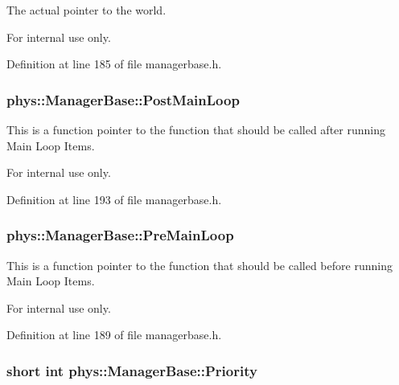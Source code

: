The actual pointer to the world. 

\begin{DoxyInternal}{For internal use only.}
\end{DoxyInternal}


Definition at line 185 of file managerbase.h.

\hypertarget{classphys_1_1ManagerBase_aa1e80a30f151c07e06d1f4650f315da5}{
\subsubsection[{PostMainLoop}]{ {\bf phys::ManagerBase::PostMainLoop}}}
\label{d2/de3/classphys_1_1ManagerBase_aa1e80a30f151c07e06d1f4650f315da5}


This is a function pointer to the function that should be called after running Main Loop Items. 

\begin{DoxyInternal}{For internal use only.}
\end{DoxyInternal}


Definition at line 193 of file managerbase.h.

\hypertarget{classphys_1_1ManagerBase_a93eb2f1a30d913a4e99180b0965eb5db}{
\subsubsection[{PreMainLoop}]{ {\bf phys::ManagerBase::PreMainLoop}}}
\label{d2/de3/classphys_1_1ManagerBase_a93eb2f1a30d913a4e99180b0965eb5db}


This is a function pointer to the function that should be called before running Main Loop Items. 

\begin{DoxyInternal}{For internal use only.}
\end{DoxyInternal}


Definition at line 189 of file managerbase.h.

\hypertarget{classphys_1_1ManagerBase_a28e2690fbcf644a7780a53b81821d8ef}{
\subsubsection[{Priority}]{\setlength{\rightskip}{0pt plus 5cm}short int {\bf phys::ManagerBase::Priority}}}
\label{d2/de3/classphys_1_1ManagerBase_a28e2690fbcf644a7780a53b81821d8ef}


